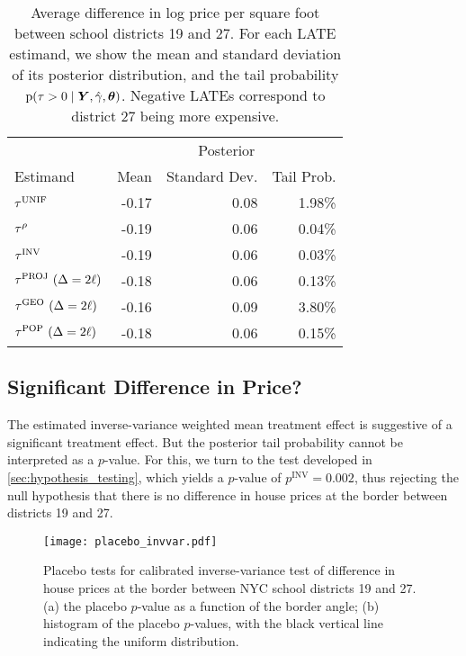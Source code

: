 \begin{table}
    \centering
    \begin{tabular}{lrrr}
        \hline
        & \multicolumn{3}{c}{Posterior} \\
        Estimand & Mean & Standard Dev. & Tail Prob. \\
        \hline
          \(\tau^{\mathrm{UNIF}}\) & -0.17 & 0.08 & 1.98\% \\
          \(\tau^{\rho}\) & -0.19 & 0.06 & 0.04\% \\
          \(\tau^{\mathrm{INV}}\) & -0.19 & 0.06 & 0.03\% \\
          \(\tau^{\mathrm{PROJ}}~(\Delta=2\ell)\) & -0.18 & 0.06 & 0.13\% \\
          \(\tau^{\mathrm{GEO}}~(\Delta=2\ell)\) & -0.16 & 0.09 & 3.80\% \\
          \(\tau^{\mathrm{POP}}~(\Delta=2\ell)\) & -0.18 & 0.06 & 0.15\% \\
        \hline
    \end{tabular}
    \caption{
    \label{table:NYC_ate}
Average difference in log price per square foot between school districts 19 and 27. For each LATE estimand, we show the mean and standard deviation of its posterior distribution, and the tail probability \(\operatorname{p}(\tau > 0 \mid \bm{Y}, \hat{\gamma}, \bm{\theta})\). 
Negative LATEs correspond to district 27 being more expensive.
}
\end{table}

\subsection{Significant Difference in Price?}
The estimated inverse-variance weighted mean treatment effect is suggestive of a significant treatment effect.
But the posterior tail probability cannot be interpreted as a \(p\)-value.
For this, we turn to the test developed in \autoref{sec:hypothesis_testing}, which yields a \(p\)-value of \(p^{\mathrm{INV}}=0.002\), thus rejecting the null hypothesis that there is no difference in house prices at the border between districts 19 and 27.

\begin{figure}[tb]
    \centering
    \texttt{[image: placebo\_invvar.pdf]}
    \caption{
    \label{fig:placebo_invvar} Placebo tests for calibrated inverse-variance test of difference in house prices at the border between NYC school districts 19 and 27. 
    (a) the placebo \(p\)-value as a function of the border angle;
    (b) histogram of the placebo \(p\)-values, 
    with the black vertical line indicating the uniform distribution.
    }
\end{figure}

